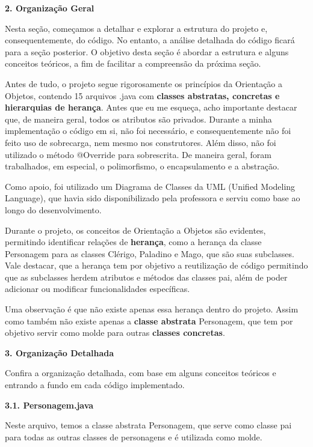 \documentclass[11pt]{uiobrev}
\begin{document}
\vspace{1.5cm}
\Large \textbf{2. Organização Geral}

\justifying
Nesta seção, começamos a detalhar e explorar a estrutura do projeto e, consequentemente, do código. No entanto, a análise detalhada do código ficará para a seção posterior. O objetivo desta seção é abordar a estrutura e alguns conceitos teóricos, a fim de facilitar a compreensão da próxima seção.

Antes de tudo, o projeto segue rigorosamente os princípios da Orientação a Objetos, contendo 15 arquivos .java com \textbf{classes abstratas, concretas e hierarquias de herança}. Antes que eu me esqueça, acho importante destacar que, de maneira geral, todos os atributos são privados. Durante a minha implementação o código em si, não foi necessário, e consequentemente não foi feito uso de sobrecarga, nem mesmo nos construtores. Além disso, não foi utilizado o método @Override para sobrescrita. De maneira geral, foram trabalhados, em especial, o polimorfismo, o encapsulamento e a abstração.

Como apoio, foi utilizado um Diagrama de Classes da UML (Unified Modeling Language), que havia sido disponibilizado pela professora e serviu como base ao longo do desenvolvimento.

Durante o projeto, os conceitos de Orientação a Objetos são evidentes, permitindo identificar relações de \textbf{herança}, como a herança da classe Personagem para as classes Clérigo, Paladino e Mago, que são suas subclasses. Vale destacar, que a herança tem por objetivo a reutilização de código permitindo que as subclasses herdem atributos e métodos das classes pai, além de poder adicionar ou modificar funcionalidades específicas.

Uma observação é que não existe apenas essa herança dentro do projeto. Assim como também não existe apenas a \textbf{classe abstrata} Personagem, que tem por objetivo servir como molde para outras \textbf{classes concretas}.

\vspace{1.5cm}
\Large \textbf{3. Organização Detalhada}

\justifying
Confira a organização detalhada, com base em alguns conceitos teóricos e entrando a fundo em cada código implementado.

\vspace{0.5cm}
\Large \textbf{3.1. Personagem.java}

Neste arquivo, temos a classe abstrata Personagem, que serve como classe pai para todas as outras classes de personagens e é utilizada como molde.
\end{document}
